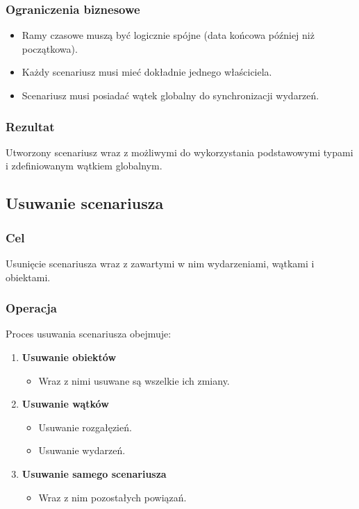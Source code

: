\subsubsection{Ograniczenia biznesowe}
\begin{itemize}
    \item Ramy czasowe muszą być logicznie spójne (data końcowa później niż początkowa).
    \item Każdy scenariusz musi mieć dokładnie jednego właściciela.
    \item Scenariusz musi posiadać wątek globalny do synchronizacji wydarzeń.
\end{itemize}

\subsubsection{Rezultat}
Utworzony scenariusz wraz z możliwymi do wykorzystania podstawowymi typami i zdefiniowanym wątkiem globalnym.

\subsection{Usuwanie scenariusza}

\subsubsection{Cel}
Usunięcie scenariusza wraz z zawartymi w nim wydarzeniami, wątkami i obiektami.

\subsubsection{Operacja}
Proces usuwania scenariusza obejmuje:
\begin{enumerate}
    \item \textbf{Usuwanie obiektów}
    \begin{itemize}
        \item Wraz z nimi usuwane są wszelkie ich zmiany.
    \end{itemize}
    \item \textbf{Usuwanie wątków}
    \begin{itemize}
        \item Usuwanie rozgałęzień.
        \item Usuwanie wydarzeń.
    \end{itemize}
    \item \textbf{Usuwanie samego scenariusza}
    \begin{itemize}
        \item Wraz z nim pozostałych powiązań.
    \end{itemize}
\end{enumerate}

